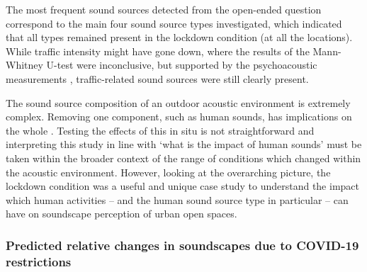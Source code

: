 \documentclass[
  authoryear,
  preprint,
  3p,
  onecolumn]{elsarticle}
\begin{document}
The most frequent sound sources detected from the open-ended question
correspond to the main four sound source types investigated, which
indicated that all types remained present in the lockdown condition (at
all the locations). While traffic intensity might have gone down, where
the results of the Mann-Whitney U-test were inconclusive, but supported
by the psychoacoustic measurements \citep{Aletta2020Assessing},
traffic-related sound sources were still clearly present.

The sound source composition of an outdoor acoustic environment is
extremely complex. Removing one component, such as human sounds, has
implications on the whole \citep{Gordo2021Rapid}. Testing the effects of
this in situ is not straightforward and interpreting this study in line
with `what is the impact of human sounds' must be taken within the
broader context of the range of conditions which changed within the
acoustic environment. However, looking at the overarching picture, the
lockdown condition was a useful and unique case study to understand the
impact which human activities -- and the human sound source type in
particular -- can have on soundscape perception of urban open spaces.

\subsubsection{Predicted relative changes in soundscapes due to COVID-19
restrictions}\label{predicted-relative-changes-in-soundscapes-due-to-covid-19-restrictions}
\end{document}
